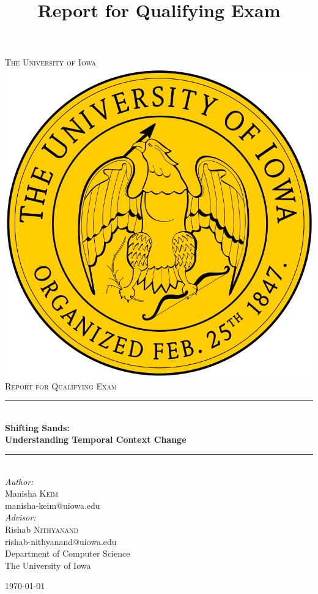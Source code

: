 
\begin{titlepage}

\newcommand{\HRule}{\rule{\linewidth}{0.5mm}}
\center

\textsc{\LARGE The University of Iowa}\\[1.5cm]
\includegraphics[scale=.1]{figures/iowa}\\[1cm]
\textsc{\Large Report for Qualifying Exam}\\[0.5cm]
\title {Report for Qualifying Exam}
\HRule \\[0.4cm]
{ \huge \bfseries Shifting Sands: \\Understanding Temporal Context Change}\\[0.4cm]
\HRule \\[1.5cm]


\emph{Author:} \\
Manisha \textsc{Keim} \\
manisha-keim@uiowa.edu \\[0.5cm]

\emph{Advisor:}\\
Rishab \textsc{Nithyanand}\\
rishab-nithyanand@uiowa.edu \\[0.5cm]

Department of Computer Science \\
The University of Iowa

{\today}\\[2cm]

\end{titlepage}
